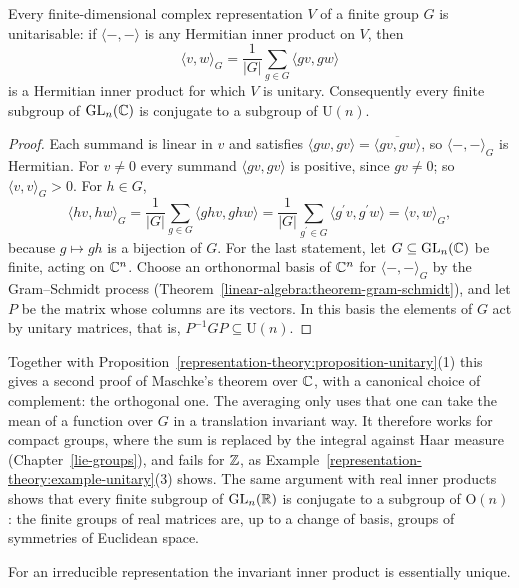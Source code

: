 \begin{theorem}\label{representation-theory:theorem-unitary-trick}
Every finite-dimensional complex representation $V$ of a finite group $G$ is unitarisable: if $\langle -, - \rangle$ is any Hermitian inner product on $V$, then
\[
\langle v, w\rangle_G = \frac{1}{|G|}\sum_{g \in G}\langle gv, gw\rangle
\]
is a Hermitian inner product for which $V$ is unitary. Consequently every finite subgroup of $\mathrm{GL}_n(\mathbb{C})$ is conjugate to a subgroup of $\mathrm{U}(n)$.
\end{theorem}

\begin{proof}
Each summand is linear in $v$ and satisfies $\langle gw, gv\rangle = \overline{\langle gv, gw\rangle}$, so $\langle -, - \rangle_G$ is Hermitian. For $v \neq 0$ every summand
$\langle gv, gv\rangle$ is positive, since $gv \neq 0$; so $\langle v, v\rangle_G > 0$. For $h \in G$,
\[
\langle hv, hw\rangle_G = \frac{1}{|G|}\sum_{g \in G}\langle ghv, ghw\rangle = \frac{1}{|G|}\sum_{g^{\prime} \in G}\langle g^{\prime}v, g^{\prime}w\rangle = \langle v, w\rangle_G,
\]
because $g \mapsto gh$ is a bijection of $G$. For the last statement, let $G \subseteq \mathrm{GL}_n(\mathbb{C})$ be finite, acting on $\mathbb{C}^n$. Choose an orthonormal basis of $\mathbb{C}^n$ for
$\langle -, - \rangle_G$ by the Gram--Schmidt process (Theorem~\ref{linear-algebra:theorem-gram-schmidt}), and let $P$ be the matrix whose columns are its vectors. In this basis the elements of
$G$ act by unitary matrices, that is, $P^{-1}GP \subseteq \mathrm{U}(n)$.
\end{proof}

Together with Proposition~\ref{representation-theory:proposition-unitary}(1) this gives a second proof of Maschke's theorem over $\mathbb{C}$, with a canonical choice of complement: the orthogonal
one. The averaging only uses that one can take the mean of a function over $G$ in a translation invariant way. It therefore works for compact groups, where the sum is replaced by the integral
against Haar measure (Chapter~\ref{lie-groups}), and fails for $\mathbb{Z}$, as Example~\ref{representation-theory:example-unitary}(3) shows. The same argument with real inner products shows
that every finite subgroup of $\mathrm{GL}_n(\mathbb{R})$ is conjugate to a subgroup of $\mathrm{O}(n)$: the finite groups of real matrices are, up to a change of basis, groups of symmetries of Euclidean space.

For an irreducible representation the invariant inner product is essentially unique.

